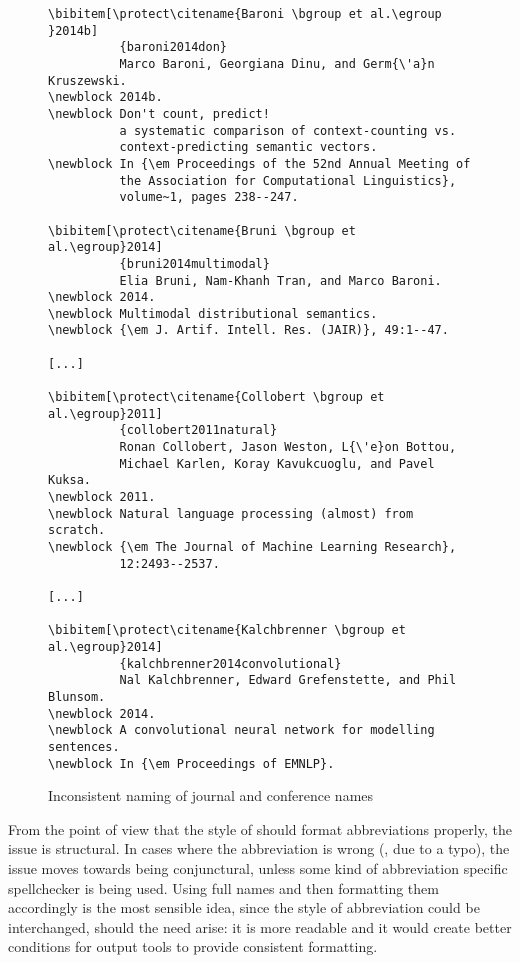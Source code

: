 \begin{figure}
  \centering
\begin{small}
\begin{verbatim}
\bibitem[\protect\citename{Baroni \bgroup et al.\egroup }2014b]
          {baroni2014don}
          Marco Baroni, Georgiana Dinu, and Germ{\'a}n Kruszewski.
\newblock 2014b.
\newblock Don't count, predict!
          a systematic comparison of context-counting vs.
          context-predicting semantic vectors.
\newblock In {\em Proceedings of the 52nd Annual Meeting of
          the Association for Computational Linguistics},
          volume~1, pages 238--247.

\bibitem[\protect\citename{Bruni \bgroup et al.\egroup}2014]
          {bruni2014multimodal}
          Elia Bruni, Nam-Khanh Tran, and Marco Baroni.
\newblock 2014.
\newblock Multimodal distributional semantics.
\newblock {\em J. Artif. Intell. Res. (JAIR)}, 49:1--47.

[...]

\bibitem[\protect\citename{Collobert \bgroup et al.\egroup}2011]
          {collobert2011natural}
          Ronan Collobert, Jason Weston, L{\'e}on Bottou,
          Michael Karlen, Koray Kavukcuoglu, and Pavel Kuksa.
\newblock 2011.
\newblock Natural language processing (almost) from scratch.
\newblock {\em The Journal of Machine Learning Research},
          12:2493--2537.

[...]

\bibitem[\protect\citename{Kalchbrenner \bgroup et al.\egroup}2014]
          {kalchbrenner2014convolutional}
          Nal Kalchbrenner, Edward Grefenstette, and Phil Blunsom.
\newblock 2014.
\newblock A convolutional neural network for modelling sentences.
\newblock In {\em Proceedings of EMNLP}.
\end{verbatim}
\end{small}
  \caption{Inconsistent naming of journal and conference names}
\label{fig:inconsistent_naming}
\end{figure}

From the point of view that the style of {\bibtex} should format
abbreviations properly, the issue is structural.  In cases where the
abbreviation is wrong (\eg, due to a typo), the issue moves towards
being conjunctural, unless some kind of abbreviation specific
spellchecker is being used.  Using full names and then formatting them
accordingly is the most sensible idea, since the style of abbreviation
could be interchanged, should the need arise: it is more readable and
it would create better conditions for output tools to provide
consistent formatting.

